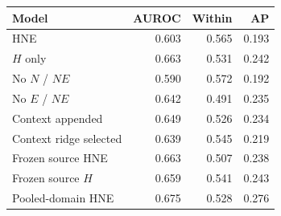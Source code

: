 \begin{tabular*}{\linewidth}{@{\extracolsep{\fill}}lrrr@{}}
\toprule
Model & AUROC & Within & AP \\
\midrule
HNE & 0.603 & 0.565 & 0.193 \\
$H$ only & 0.663 & 0.531 & 0.242 \\
No $N$ / $NE$ & 0.590 & 0.572 & 0.192 \\
No $E$ / $NE$ & 0.642 & 0.491 & 0.235 \\
Context appended & 0.649 & 0.526 & 0.234 \\
Context ridge selected & 0.639 & 0.545 & 0.219 \\
Frozen source HNE & 0.663 & 0.507 & 0.238 \\
Frozen source $H$ & 0.659 & 0.541 & 0.243 \\
Pooled-domain HNE & 0.675 & 0.528 & 0.276 \\
\bottomrule
\end{tabular*}